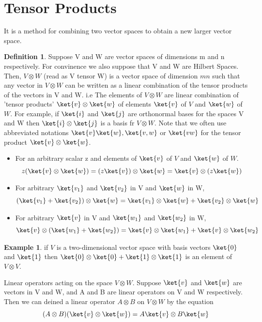 \documentclass[12pt, oneside]{book}
\theoremstyle{definition}
\newtheorem{definition}{Definition}[section]
\theoremstyle{definition}
\newtheorem{example}{Example}[section]
\theoremstyle{remark}
\begin{document}
\section{Tensor Products}
It is a method for combining two vector spaces to obtain a new larger vector space. 
\begin{definition}
    Suppose V and W are vector spaces of dimensions m and n respectively. For convinence we also suppose that V and W are Hilbert Spaces. Then,
    $V \otimes W$ (read as V tensor W) is a vector space of dimension $mn$ such that any vector in $V \otimes W$ can be written as a linear combination of the tensor products of the vectors in V and W. i.e 
    The elements of $V \otimes W$ are linear combination of 'tensor products' $\ket{v} \otimes \ket{w}$ of elements $\ket{v}$ of $V$ and $\ket{w}$ of $W$. For example, if $\ket{i}$ and 
    $\ket{j}$ are orthonormal bases for the spaces V and W then $\ket{i} \otimes \ket{j}$ is a basis fr $V \otimes W$. Note that we often use abbreviated notations $\ket{v}\ket{w},\ket{v,w}$ 
    or $\ket{vw}$ for the tensor product $\ket{v} \otimes \ket{w}$. 
    \begin{itemize}
        \item For an arbitrary scalar z and elements of $\ket{v}$ of $V$ and $\ket{w}$ of $W$.
        \[ z(\ket{v} \otimes \ket{w}) = (z\ket{v}) \otimes \ket{w} = \ket{v} \otimes (z\ket{w}) \]
        \item For arbitrary $\ket{v_1}$ and $\ket{v_2}$ in V and $\ket{w}$ in W,
        \[ (\ket{v_1}+\ket{v_2}) \otimes \ket{w} = \ket{v_1} \otimes \ket{w} + \ket{v_2} \otimes \ket{w} \]
        \item For arbitrary $\ket{v}$ in V and $\ket{w_1}$ and $\ket{w_2}$ in W,
        \[ \ket{v} \otimes (\ket{w_1}+\ket{w_2}) = \ket{v} \otimes \ket{w_1} + \ket{v} \otimes \ket{w_2} \]
    \end{itemize}
\end{definition}

\begin{example}
    if $V$ is a two-dimensional vector space with basis vectors $\ket{0}$ and $\ket{1}$ then $\ket{0} \otimes \ket{0} + \ket{1} \otimes \ket{1}$ is an element of 
    $V \otimes V$.
\end{example}

Linear operators acting on the space $V\otimes W$. Suppose $\ket{v}$ and $\ket{w}$ are vectors in V and W, and A and B are linear operators 
on V and W respectively. Then we can deined a linear operator $A \otimes B$ on $V \otimes W$ by the equation
\[ (A \otimes B)(\ket{v} \otimes \ket{w}) = A\ket{v} \otimes B\ket{w} \]
\end{document}
